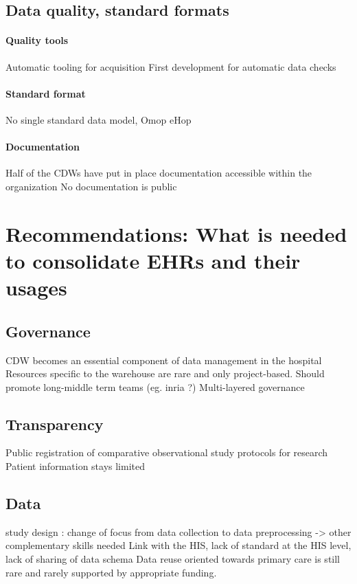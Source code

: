 \documentclass{report}
\begin{document}
\subsection{Data quality, standard formats}\label{subsec:cdw:results:data_quality}
\paragraph{Quality tools}
Automatic tooling for acquisition
First development for automatic data checks
\paragraph{Standard format}
No single standard data model,
Omop
eHop
\paragraph{Documentation}
Half of the CDWs have put in place documentation accessible within the organization
No documentation is public

\section{Recommendations: What is needed to consolidate EHRs and their usages}\label{sec:cdw:recommendations}

\subsection{Governance}\label{subsec:cdw:recommendations:governance}
CDW becomes an essential component of data management in the hospital
Resources specific to the warehouse are rare and only project-based. Should promote long-middle term teams (eg. inria ?)
Multi-layered governance
\subsection{Transparency}
Public registration of comparative observational study protocols for research
Patient information stays limited
\subsection{Data}
study design : change of focus from data collection to data preprocessing -> other complementary skills needed
Link with the HIS, lack of standard at the HIS level, lack of sharing of data schema
Data reuse oriented towards primary care is still rare and rarely supported by appropriate funding.
\end{document}
